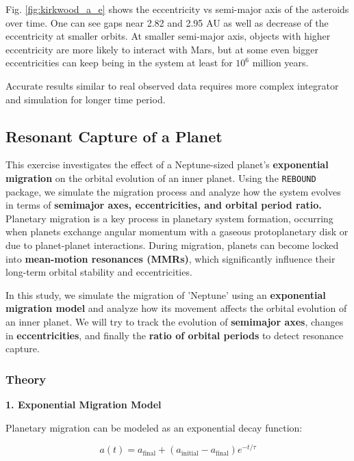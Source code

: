 \documentclass[12pt,a4paper]{article}
\begin{document}
Fig. \ref{fig:kirkwood_a_e} shows the eccentricity vs semi-major axis of the asteroids over time. One can see gaps near 2.82 and 2.95 AU as well as decrease of the eccentricity at smaller orbits.
At smaller semi-major axis, objects with higher eccentricity are more likely to interact with Mars, but at some even bigger eccentricities can keep being in the system at least for $10^6$ million years.

Accurate results similar to real observed data requires more complex integrator and simulation for longer time period.


\subsection{Resonant Capture of a Planet}
\label{sec:resonant_capture}
This exercise investigates the effect of a Neptune-sized planet's \textbf{exponential migration} on the orbital evolution of an inner planet. Using the \texttt{REBOUND} package, we simulate the migration process and analyze how the system evolves in terms of \textbf{semimajor axes, eccentricities, and orbital period ratio.}
\\ Planetary migration is a key process in planetary system formation, occurring when planets exchange angular momentum with a gaseous protoplanetary disk or due to planet-planet interactions. During migration, planets can become locked into \textbf{mean-motion resonances (MMRs)}, which significantly influence their long-term orbital stability and eccentricities.

In this study, we simulate the migration of 'Neptune' using an \textbf{exponential migration model} and analyze how its movement affects the orbital evolution of an inner planet. We will try to track the evolution of \textbf{semimajor axes}, changes in \textbf{eccentricities}, and finally the \textbf{ratio of orbital periods} to detect resonance capture.

\subsubsection{Theory}

\textbf{1. Exponential Migration Model}

Planetary migration can be modeled as an exponential decay function:

\begin{equation}
    a(t) = a_{\text{final}} + (a_{\text{initial}} - a_{\text{final}}) e^{-t/\tau}
    \label{eq:a_expo_decay}
\end{equation}
\end{document}
